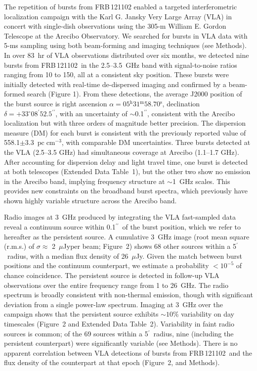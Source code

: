 \documentclass{nature_frb}
\newcommand{\frb}{FRB\,121102}
\newcommand{\uJy}{$\mu$Jy}
\newcommand{\dmu}{\ensuremath{\mathrm{pc\; cm^{-3}}}}
\newcommand{\arcsec}{\ensuremath{^{\prime\prime}}}
\newcommand{\arcmin}{\ensuremath{^{\prime}}}
\newcommand{\degree}{\ensuremath{^\circ}}
\newcommand{\hs}{\ensuremath{^{\mathrm{s}}}}
\newcommand{\hm}{\ensuremath{^{\mathrm{m}}}}
\newcommand{\hh}{\ensuremath{^{\mathrm{h}}}}
\begin{document}
The repetition of  bursts from \frb\cite{ssh+16a,ssh+16b} enabled a targeted interferometric localization campaign with the Karl G. Jansky Very Large Array (VLA) in concert with single-dish observations using
the 305-m William E. Gordon Telescope at the Arecibo Observatory. We searched for bursts in VLA  data with 5-ms sampling  using both beam-forming and imaging techniques\cite{lbb+15} (see Methods). In over 83~hr of VLA observations distributed over six months, we detected nine bursts from \frb\ in the 2.5--3.5~GHz band
with signal-to-noise ratios ranging from 10 to 150, all at a consistent sky position.
These bursts were initially detected with real-time de-dispersed imaging and confirmed by a beam-formed search (Figure 1).
From these detections, the average J2000 position of the burst source is right ascension $\alpha = 05\hh31\hm58.70\hs$, declination $\delta = +33\degree08\arcmin52.5\arcsec$, with an uncertainty of $\sim$0.1\arcsec, consistent with the Arecibo localization\cite{ssh+16a} but with three orders of magnitude better precision. The dispersion measure (DM) for each burst is consistent with the previously reported value\cite{ssh+16a} of 558.1$\pm$3.3~\dmu, with comparable DM uncertainties.
Three bursts detected at the VLA (2.5--3.5 GHz) had simultaneous coverage at Arecibo (1.1--1.7 GHz). After accounting for dispersion delay and light travel time, one burst is detected at both telescopes (Extended Data Table~1), but the other two show no emission in the Arecibo band, implying frequency structure at $\sim$1~GHz  scales. This provides new constraints on the broadband burst spectra, which previously have shown  highly variable  structure across the Arecibo band\cite{sch+14, ssh+16a, ssh+16b}.

Radio images at 3~GHz produced by integrating the VLA fast-sampled data reveal a continuum source within 0.1\arcsec\ of the burst position, which we refer to hereafter as the persistent source. A cumulative 3~GHz image (root mean square (r.m.s.) of $\sigma \approx$ 2~\uJy per beam; Figure~2) shows 68 other sources within a 5\arcmin\ radius, with a median flux density of 26~\uJy.
Given the match between burst positions and the continuum counterpart, we estimate a  probability $< 10^{-5}$ of chance coincidence.
The persistent source is detected in follow-up VLA observations over the entire  frequency range from 1 to 26~GHz. The radio spectrum is broadly consistent with non-thermal emission, though with significant deviation from a single power-law spectrum.
Imaging at 3~GHz over the campaign shows that the persistent source exhibits $\sim 10$\% variability on day timescales (Figure~2 and Extended Data Table~2). Variability in faint radio sources is common\cite{wb16,vrm+16}; of the 69 sources within a 5\arcmin\ radius, nine (including the persistent counterpart) were significantly variable (see Methods).
There is no apparent correlation between VLA detections of bursts from \frb\ and the flux density of the counterpart at that epoch (Figure~2, and Methods).
\end{document}
